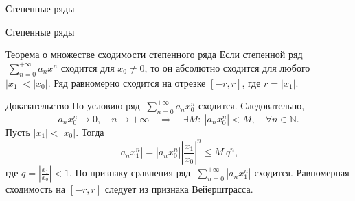 \documentclass[8pt]{beamer}
\begin{document}
\begin{frame}{Степенные ряды}

\end{frame}

\begin{frame}{Степенные ряды}
\begin{block}{Теорема о множестве сходимости степенного ряда}
Если степенной ряд $\ \displaystyle \sum_{n=0}^{+\infty}a_n x^n$ сходится для $x_0\ne 0$, то он абсолютно сходится для любого~$|x_1|<|x_0|$. Ряд равномерно сходится на отрезке $[-r,r]$, где $r=|x_1|$.
\end{block}
\begin{block}{Доказательство}
По условию ряд $\ \displaystyle \sum_{n=0}^{+\infty}a_n x_0^n$ сходится. Следовательно,
$$a_n x_0^n\to 0,\quad n\to+\infty \quad \Rightarrow \quad \exists M:\ |a_n x_0^n|<M,\quad \forall n\in\mathbb{N}.$$
Пусть $|x_1|<|x_0|$. Тогда
$$|a_n x_1^n|= |a_n x_0^n| \left| \frac{x_1}{x_0} \right|^n \le M\ q^n,$$
где $q = \left| \frac{x_1}{x_0} \right|<1$. По признаку сравнения ряд  $\ \displaystyle \sum_{n=0}^{+\infty}|a_n x_1^n|$ сходится. Равномерная сходимость на $[-r,r]$ следует из признака Вейерштрасса.
\end{block}
\end{frame}
\end{document}
